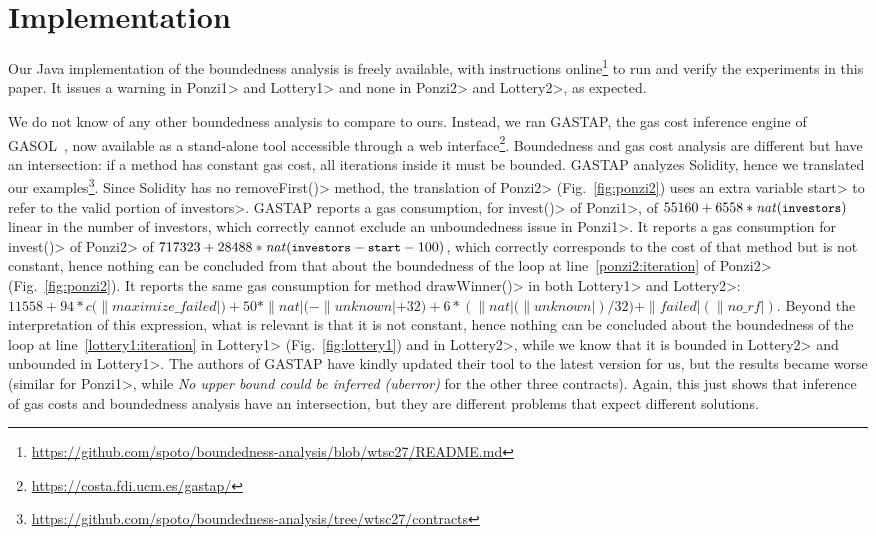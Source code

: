 \section{Implementation}\label{sec:implementation}
%
Our Java implementation of the boundedness analysis is
freely available, with instructions online\footnote{\url{https://github.com/spoto/boundedness-analysis/blob/wtsc27/README.md}}
to run and verify
the experiments in this paper. It issues a warning in \<Ponzi1> and \<Lottery1>
and none in \<Ponzi2> and \<Lottery2>, as expected.

We do not know of any other boundedness analysis to compare to ours.
Instead, we ran GASTAP, the gas cost inference engine of
GASOL~\cite{AlbertCGRR20}, now available as a stand-alone
tool accessible through a web interface\footnote{\url{https://costa.fdi.ucm.es/gastap/}}.
Boundedness and gas cost analysis are different but have an intersection:
if a method has constant gas cost, all iterations inside it must be bounded.
GASTAP analyzes Solidity, hence we translated our
examples\footnote{\url{https://github.com/spoto/boundedness-analysis/tree/wtsc27/contracts}}.
Since Solidity has no \<removeFirst()> method, the translation
of \<Ponzi2> (Fig.~\ref{fig:ponzi2})
uses an extra variable \<start> to refer to the valid portion of \<investors>.
GASTAP reports a gas consumption, for \<invest()> of \<Ponzi1>, of
$55160+6558*\|nat|(\<investors>)$\ie linear in the number of investors,
which correctly cannot exclude an unboundedness issue in \<Ponzi1>.
It reports a gas consumption for \<invest()> of \<Ponzi2> of
$717323+28488*\|nat|(\<investors>-\<start>-100)$, which correctly corresponds
to the cost of that method but is not constant,
hence nothing can be concluded from that about the boundedness of the loop
at line~\ref{ponzi2:iteration} of \<Ponzi2> (Fig.~\ref{fig:ponzi2}).
It reports the same gas consumption for method \<drawWinner()> in both
\<Lottery1> and \<Lottery2>:
$11558+94*c(\|maximize\_failed|)+50*\|nat|(-\|unknown|+32)+6*(\|nat|(\|unknown|)/32)+\|failed|(\|no\_rf|)$.
Beyond the interpretation of this expression,
what is relevant is that it is not constant, hence
nothing can be concluded about the boundedness of the loop
at line~\ref{lottery1:iteration} in \<Lottery1> (Fig.~\ref{fig:lottery1})
and in \<Lottery2>, while
we know that it is bounded in \<Lottery2> and unbounded in \<Lottery1>.
The authors of GASTAP have kindly updated their tool to the latest version for us,
but the results became worse (similar for \<Ponzi1>, while \emph{No upper bound could be inferred (uberror)}
for the other three contracts).
Again, this just shows that inference of gas costs and boundedness analysis
have an intersection, but they are different problems that expect different solutions.
